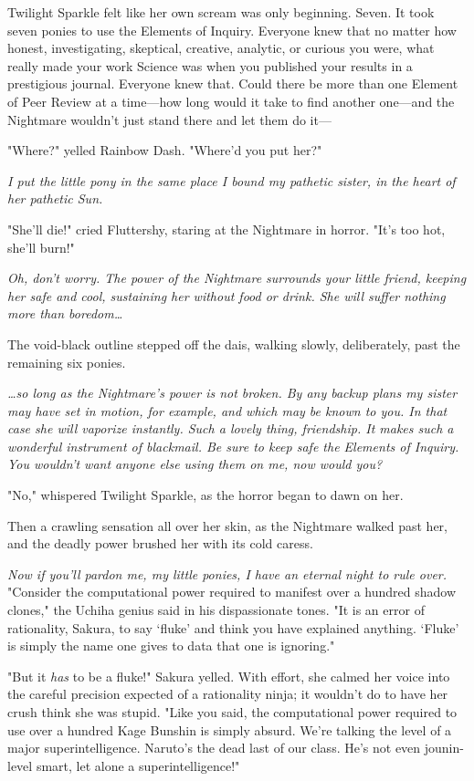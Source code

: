 Twilight Sparkle felt like her own scream was only beginning. Seven. It took
seven ponies to use the Elements of Inquiry. Everyone knew that no matter how
honest, investigating, skeptical, creative, analytic, or curious you were, what
really made your work Science was when you published your results in a
prestigious journal. Everyone knew that. Could there be more than one Element
of Peer Review at a time---how long would it take to find another one---and the
Nightmare wouldn't just stand there and let them do it---

"Where?" yelled Rainbow Dash. "Where'd you put her?"

\emph{I put the little pony in the same place I bound my pathetic sister, in
the heart of her pathetic Sun.}

"She'll die!" cried Fluttershy, staring at the Nightmare in horror. "It's too
hot, she'll burn!"

\emph{Oh, don't worry. The power of the Nightmare surrounds your little friend,
keeping her safe and cool, sustaining her without food or drink. She will
suffer nothing more than boredom{\ldots}}

The void-black outline stepped off the dais, walking slowly, deliberately, past
the remaining six ponies.

\emph{{\ldots}so long as the Nightmare's power is not broken. By any backup
plans my sister may have set in motion, for example, and which may be known to
you. In that case she will vaporize instantly. Such a lovely thing, friendship.
It makes such a wonderful instrument of blackmail. Be sure to keep safe the
Elements of Inquiry. You wouldn't want anyone else using them on me, now would
you?}

"No," whispered Twilight Sparkle, as the horror began to dawn on her.

Then a crawling sensation all over her skin, as the Nightmare walked past her,
and the deadly power brushed her with its cold caress.

\emph{Now if you'll pardon me, my little ponies, I have an eternal night to
rule over.}
\sbreak
"Consider the computational power required to manifest over a hundred shadow
clones," the Uchiha genius said in his dispassionate tones. "It is an error of
rationality, Sakura, to say `fluke' and think you have explained anything.
`Fluke' is simply the name one gives to data that one is ignoring."

"But it \emph{has} to be a fluke!" Sakura yelled. With effort, she calmed her
voice into the careful precision expected of a rationality ninja; it wouldn't
do to have her crush think she was stupid. "Like you said, the computational
power required to use over a hundred Kage Bunshin is simply absurd. We're
talking the level of a major superintelligence. Naruto's the dead last of our
class. He's not even jounin-level smart, let alone a superintelligence!"

